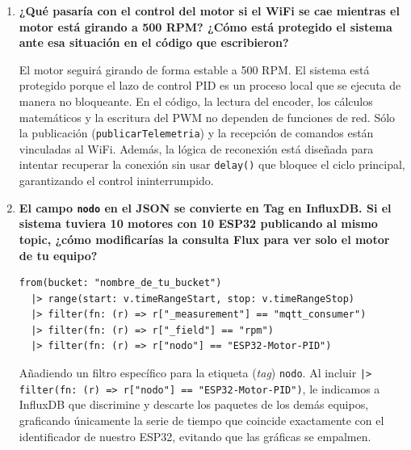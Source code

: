 \documentclass[11pt, letterpaper]{article}
\begin{document}
\begin{enumerate}[leftmargin=1.5cm, label=\textbf{P\arabic*.}, itemsep=0.4cm]
    Esta consulta filtra los datos de la \'ultima hora para el campo \texttt{error} y extrae exclusivamente el pico m\'as alto registrado. En t\'erminos de sintonizaci\'on, este valor representa el peor escenario de desviaci\'on (ya sea por un cambio de \textit{setpoint} o una perturbaci\'on f\'isica). Si el valor devuelto por \texttt{max()} es excesivamente alto, indica que el PID es muy lento para reaccionar o sufre de un sobreimpulso severo, sugiriendo que se debe ajustar la ganancia Proporcional ($K_p$) o Integral ($K_i$).
  

  \item \textbf{¿Qu\'e pasar\'ia con el control del motor si el
        WiFi se cae mientras el motor est\'a girando a 500 RPM?
        ¿C\'omo est\'a protegido el sistema ante esa situaci\'on
        en el c\'odigo que escribieron?}

    El motor seguir\'a girando de forma estable a 500 RPM. El sistema est\'a protegido porque el lazo de control PID es un proceso local que se ejecuta de manera no bloqueante. En el c\'odigo, la lectura del encoder, los c\'alculos matem\'aticos y la escritura del PWM no dependen de funciones de red. S\'olo la publicaci\'on (\texttt{publicarTelemetria}) y la recepci\'on de comandos est\'an vinculadas al WiFi. Adem\'as, la l\'ogica de reconexi\'on est\'a diseñada para intentar recuperar la conexi\'on sin usar \texttt{delay()} que bloquee el ciclo principal, garantizando el control ininterrumpido.
  

  \item \textbf{El campo \texttt{nodo} en el JSON se convierte en
        Tag en InfluxDB. Si el sistema tuviera 10 motores
        con 10 ESP32 publicando al mismo topic, ¿c\'omo modificar\'ias
        la consulta Flux para ver solo el motor de tu equipo?}

  \begin{lstlisting}[style=flux, numbers=none]
from(bucket: "nombre_de_tu_bucket")
  |> range(start: v.timeRangeStart, stop: v.timeRangeStop)
  |> filter(fn: (r) => r["_measurement"] == "mqtt_consumer")
  |> filter(fn: (r) => r["_field"] == "rpm")
  |> filter(fn: (r) => r["nodo"] == "ESP32-Motor-PID")
  \end{lstlisting}

    A\~nadiendo un filtro espec\'ifico para la etiqueta (\textit{tag}) \texttt{nodo}. Al incluir \texttt{|> filter(fn: (r) => r["nodo"] == "ESP32-Motor-PID")}, le indicamos a InfluxDB que discrimine y descarte los paquetes de los dem\'as equipos, graficando \'unicamente la serie de tiempo que coincide exactamente con el identificador de nuestro ESP32, evitando que las gr\'aficas se empalmen.
  


\end{enumerate}
\end{document}
